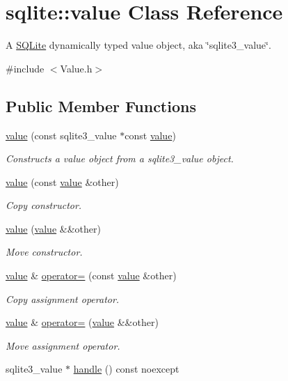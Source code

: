 \hypertarget{a00015}{\section{sqlite\-:\-:value Class Reference}
\label{a00015}
}


A \hyperlink{a00038}{S\-Q\-Lite} dynamically typed value object, aka \char`\"{}sqlite3\-\_\-value\char`\"{}.  




{\ttfamily \#include $<$Value.\-h$>$}

\subsection*{Public Member Functions}
\begin{DoxyCompactItemize}
\item 
\hyperlink{a00015_ad297a88d479f1818a65dadd726161785}{value} (const sqlite3\-\_\-value $\ast$const \hyperlink{a00015}{value})
\begin{DoxyCompactList}\small\item\em Constructs a value object from a sqlite3\-\_\-value object. \end{DoxyCompactList}\item 
\hyperlink{a00015_aa8e08aeebbd2a89075647a8418a7eae7}{value} (const \hyperlink{a00015}{value} \&other)
\begin{DoxyCompactList}\small\item\em Copy constructor. \end{DoxyCompactList}\item 
\hyperlink{a00015_a0ee5bf64b3377bd2ec6da01b066f62cb}{value} (\hyperlink{a00015}{value} \&\&other)
\begin{DoxyCompactList}\small\item\em Move constructor. \end{DoxyCompactList}\item 
\hyperlink{a00015}{value} \& \hyperlink{a00015_ab67e08529ef687899b08ad6fa50d4301}{operator=} (const \hyperlink{a00015}{value} \&other)
\begin{DoxyCompactList}\small\item\em Copy assignment operator. \end{DoxyCompactList}\item 
\hyperlink{a00015}{value} \& \hyperlink{a00015_aa3d30541555ecc3f54216ce80f2e482f}{operator=} (\hyperlink{a00015}{value} \&\&other)
\begin{DoxyCompactList}\small\item\em Move assignment operator. \end{DoxyCompactList}\item 
\hypertarget{a00015_a668839eab925862f57489429305be72d}{sqlite3\-\_\-value $\ast$ \hyperlink{a00015_a668839eab925862f57489429305be72d}{handle} () const noexcept}\label{a00015_a668839eab925862f57489429305be72d}


\end{DoxyCompactItemize}
